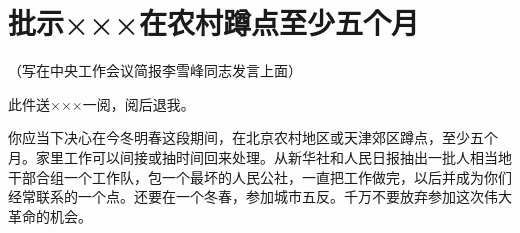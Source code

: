 \section[批示×××在农村蹲点至少五个月（一九六三年六月三日）]{批示×××在农村蹲点至少五个月}
{\noindent\kaishu\centering （写在中央工作会议简报李雪峰同志发言上面）\par}

此件送×××一阅，阅后退我。

你应当下决心在今冬明春这段期间，在北京农村地区或天津郊区蹲点，至少五个月。家里工作可以间接或抽时间回来处理。从新华社和人民日报抽出一批人相当地干部合组一个工作队，包一个最坏的人民公社，一直把工作做完，以后并成为你们经常联系的一个点。还要在一个冬春，参加城市五反。千万不要放弃参加这次伟大革命的机会。


